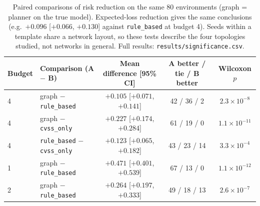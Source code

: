 \documentclass[11pt]{article}
\begin{document}
\begin{table}[h]
\centering
\small
\begin{tabular}{llccc}
\toprule
Budget & Comparison (A $-$ B) & Mean difference [95\% CI] & A better / tie / B better & Wilcoxon $p$ \\
\midrule
4 & graph $-$ \texttt{rule\_based} & $+0.105$ [$+0.071$, $+0.141$] & 42 / 36 / 2 & $2.3 \times 10^{-8}$ \\
4 & graph $-$ \texttt{cvss\_only} & $+0.227$ [$+0.174$, $+0.284$] & 61 / 19 / 0 & $1.1 \times 10^{-11}$ \\
4 & \texttt{rule\_based} $-$ \texttt{cvss\_only} & $+0.123$ [$+0.065$, $+0.182$] & 43 / 23 / 14 & $3.3 \times 10^{-4}$ \\
1 & graph $-$ \texttt{rule\_based} & $+0.471$ [$+0.401$, $+0.539$] & 67 / 13 / 0 & $1.1 \times 10^{-12}$ \\
2 & graph $-$ \texttt{rule\_based} & $+0.264$ [$+0.197$, $+0.333$] & 49 / 18 / 13 & $2.6 \times 10^{-7}$ \\
\bottomrule
\end{tabular}
\caption{Paired comparisons of risk reduction on the same 80 environments (graph = planner on the true model). Expected-loss reduction gives the same conclusions (e.g.\ $+0.096$ [$+0.066$, $+0.130$] against \texttt{rule\_based} at budget 4). Seeds within a template share a network layout, so these tests describe the four topologies studied, not networks in general. Full results: \texttt{results/significance.csv}.}
\label{tab:sig}
\end{table}
\end{document}
